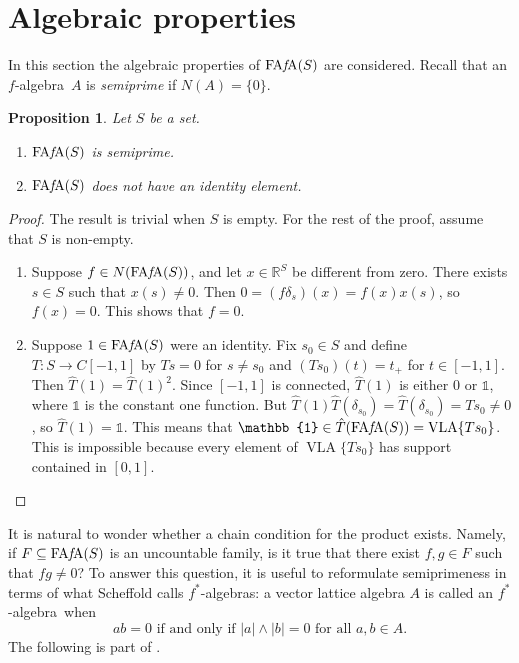 \documentclass{memo-l}
\newtheorem{prop}[theorem]{Proposition}
\theoremstyle{definition}
\theoremstyle{remark}
\numberwithin{section}{chapter}
\numberwithin{equation}{chapter}
\newcommand\R{\ensuremath{\mathbb{R}}}
\newcommand{\one}{\ensuremath{\mathbb{1}}}
\newcommand{\falg}{$f\!$-algebra}
\newcommand{\fstar}{$f^{*}\!$-algebra}
\newcommand{\VLA}{\operatorname{VLA}}
\newcommand{\FAFA}[1]{\operatorname{FA{\it f}\!A}(#1)}
\begin{document}
\section{Algebraic properties}\label{sec:alg_prop_FAFA}

In this section the algebraic properties of $\FAFA S$ are considered.
Recall that an \falg\ $A$ is \emph{semiprime} if $N(A)=\{0\}$.

\begin{prop}\label{prop:FAFA_no_identity}
    Let $S$ be a set.
    \begin{enumerate}
        \item $\FAFA S$ is semiprime.
        \item $\FAFA S$ does not have an identity element.
    \end{enumerate}
\end{prop}
\begin{proof}
    The result is trivial when $S$ is empty. For the rest of the
    proof, assume that $S$ is non-empty.
    \begin{enumerate}
        \item Suppose $f \in N(\FAFA S)$, and let $x \in \R^{S}$ be
            different from zero. There exists $s \in S$ such that
            $x(s)\neq 0$. Then $0=(f\delta _s)(x)=f(x)x(s)$, so
            $f(x)=0$. This shows that $f =0$.
        \item Suppose $1 \in \FAFA S$ were an identity. Fix $s_0\in S$
            and define $T\colon S\to C[-1,1]$ by $Ts=0$ for $s\neq
            s_0$ and $(Ts_0)(t)=t_+$ for $t \in [-1,1]$. Then
            $\hat{T}(1)=\hat{T}(1)^2$. Since
            $[-1,1]$ is connected, $\hat{T}(1)$ is either $0$ or
            $\one$, where $\one$ is the constant one
            function. But $\hat{T}(1)\hat{T}(\delta
            _{s_0})=\hat{T}(\delta _{s_0})=Ts_0\neq 0$, so
            $\hat{T}(1)=\one$. This means that $\one\in
            \hat{T}(\FAFA S)=\VLA\{Ts_0\}$. This is impossible because every element of $\VLA\{Ts_0\}$ has support contained
            in $[0,1]$.\qedhere
    \end{enumerate}
\end{proof}

It is natural to wonder whether a chain condition for the product
exists. Namely, if $F\subseteq \FAFA S$ is an uncountable family, is
it true that there exist $f,g \in F$ such that $fg\neq 0$? To answer
this question, it is useful to reformulate semiprimeness in terms of
what Scheffold \cite{scheffold1981} calls \fstar s: a vector lattice
algebra $A$ is called an \fstar\ when
\[
ab=0\text{ if and only if }|a|\wedge |b|=0\text{ for all }a,b \in A.
\]
The following is part of \cite[Théorème
9.3.1]{bigard_klaus_wolfenstein1977}.
\end{document}
